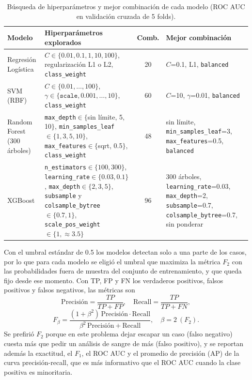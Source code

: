 \documentclass[conference]{IEEEtran}
\begin{document}
\begin{table}[!t]
\centering
\footnotesize
\caption{Búsqueda de hiperparámetros y mejor combinación de cada modelo (ROC AUC en validación cruzada de 5 folds).}
\label{tab:rejillas}
\begin{tabular}{l p{7.2cm} c p{5.6cm}}
\toprule
Modelo & Hiperparámetros explorados & Comb. & Mejor combinación \\
\midrule
Regresión Logística & $C\in\{0.01,0.1,1,10,100\}$, regularización L1 o L2, \texttt{class\_weight} & 20 & $C$=0.1, L1, \texttt{balanced} \\
SVM (RBF) & $C\in\{0.01,\ldots,100\}$, $\gamma\in\{\texttt{scale},0.001,\ldots,10\}$, \texttt{class\_weight} & 60 & $C$=10, $\gamma$=0.01, \texttt{balanced} \\
Random Forest (300 árboles) & \texttt{max\_depth}$\in\{$sin límite, 5, 10$\}$, \texttt{min\_samples\_leaf}$\in\{1,3,5,10\}$, \texttt{max\_features}$\in\{$sqrt, 0.5$\}$, \texttt{class\_weight} & 48 & sin límite, \texttt{min\_samples\_leaf}=3, \texttt{max\_features}=0.5, \texttt{balanced} \\
XGBoost & \texttt{n\_estimators}$\in\{100,300\}$, \texttt{learning\_rate}$\in\{0.03,0.1\}$, \texttt{max\_depth}$\in\{2,3,5\}$, \texttt{subsample} y \texttt{colsample\_bytree}$\in\{0.7,1\}$, \texttt{scale\_pos\_weight}$\in\{1, \approx3.5\}$ & 96 & 300 árboles, \texttt{learning\_rate}=0.03, \texttt{max\_depth}=2, \texttt{subsample}=0.7, \texttt{colsample\_bytree}=0.7, sin ponderar \\
\bottomrule
\end{tabular}
\end{table}

Con el umbral estándar de 0.5 los modelos detectan solo a una parte de los casos, por lo que para cada modelo se eligió el umbral que maximiza la métrica $F_2$ con las probabilidades fuera de muestra del conjunto de entrenamiento, y que queda fijo desde ese momento. Con TP, FP y FN los verdaderos positivos, falsos positivos y falsos negativos, las métricas son
\begin{equation}
\text{Precisión}=\frac{TP}{TP+FP},\quad \text{Recall}=\frac{TP}{TP+FN},
\end{equation}
\begin{equation}
F_\beta=\frac{(1+\beta^2)\,\text{Precisión}\cdot\text{Recall}}{\beta^2\,\text{Precisión}+\text{Recall}},\quad \beta=2\ (F_2).
\end{equation}
Se prefirió $F_2$ porque en este problema dejar escapar un caso (falso negativo) cuesta más que pedir un análisis de sangre de más (falso positivo), y se reportan además la exactitud, el $F_1$, el ROC AUC y el promedio de precisión (AP) de la curva precisión-recall, que es más informativo que el ROC AUC cuando la clase positiva es minoritaria.
\end{document}
